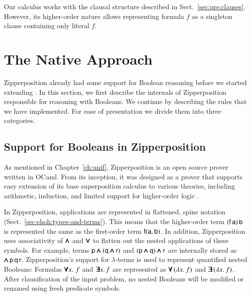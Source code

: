 Our calculus works with the clausal structure described in Sect.~\ref{sec:pre:clauses}.
However, its higher-order nature allows representing formula $f$ as a singleton clause
containing only literal $f$.

\section{The Native Approach} 
\label{sect:bool:native}

Zipperposition already had some support for Boolean reasoning before we
started extending \lsup{}. In this section, we first
describe the internals of Zipperposition responsible for reasoning with
Booleans. We continue by describing the rules that we have
implemented. For ease of presentation we divide them into three categories.
\subsection{Support for Booleans in Zipperposition}
\label{subsect:bool:zip-bools}

As mentioned in Chapter~\ref{ch:unif}, Zipperposition is an open source prover
written in OCaml. From its inception, it was designed as a prover that supports
easy extension of its base superposition calculus to various theories, including
arithmetic, induction, and limited support for higher-order logic
\cite{sc-15-simon-phd,sc-supind-17}.

In Zipperposition, applications are represented in flattened, spine notation (Sect.~\ref{sec:ehoh:types-and-terms}).
This means that the higher-order term $(\mathsf{f} \, \mathsf{a}) \, \mathsf{b}$ is
represented the same as the first-order term $\mathsf{f}(\mathsf{a}, \mathsf{b})$. In
addition, Zipperposition uses associativity of $\pmb{\land}$ and $\pmb{\lor}$ to flatten out
the nested applications of these symbols. For example, terms $\mathsf{p} \pmb{\land}
(\mathsf{q} \pmb{\land} \mathsf{r})$ and $(\mathsf{p} \pmb{\land} \mathsf{q}) \pmb{\land} \mathsf{r}$ are
internally stored as $\pmb{\land} \, \mathsf{p} \, \mathsf{q} \, \mathsf{r}$. Zipperposition's
support for $\lambda$-terms is used to represent quantified nested Booleans:
Formulas $\pmb{\forall} x. \, \, f$ and $\pmb{\exists} x. \, f$ are represented as
$\pmb{\forall} \, (\lambda x.\> f)$ and $\pmb{\exists} \, (\lambda x.\> f)$. After clausification of
the input problem, no nested Booleans will be modified or renamed using fresh
predicate symbols.

